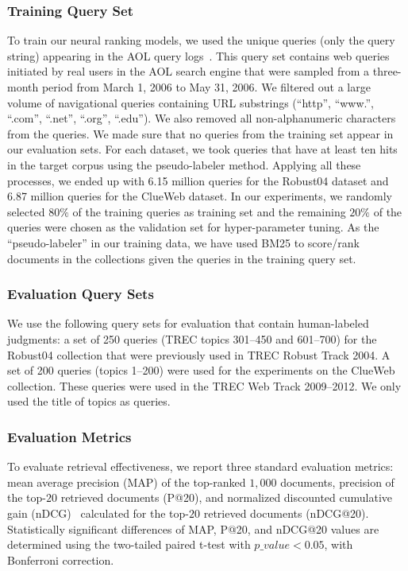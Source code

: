 \subsubsection{Training Query Set}
\label{sec:query_set}
To train our neural ranking models, we used the unique queries (only the query string) appearing in the AOL query logs~\citep{Pass:2006}. This query set contains web queries initiated by real users in the AOL search engine that were sampled from a three-month period from March 1, 2006 to May 31, 2006. We filtered out a large volume of navigational queries containing URL substrings (``http'', ``www.'', ``.com'', ``.net'', ``.org'', ``.edu''). We also removed all non-alphanumeric characters from the queries. We made sure that no queries from the training set appear in our evaluation sets. For each dataset, we took queries that have at least ten hits in the target corpus using the pseudo-labeler method. Applying all these processes, we ended up with 6.15 million queries for the Robust04 dataset and 6.87 million queries for the ClueWeb dataset. 
In our experiments, we randomly selected $80\%$ of the training queries as training set and the remaining $20\%$ of the queries were chosen as the validation set for hyper-parameter tuning. As the ``pseudo-labeler'' in our training data, we have used BM25 to score/rank documents in the collections given the queries in the training query set.

\subsubsection{Evaluation Query Sets} 
We use the following query sets for evaluation that contain human-labeled judgments: a set of 250 queries (TREC topics 301--450 and 601--700) for the Robust04 collection that were previously used in TREC Robust Track 2004. A set of 200 queries (topics 1--200) were used for the experiments on the ClueWeb collection. These queries were used in the TREC Web Track 2009--2012. We only used the title of topics as queries.

\subsubsection{Evaluation Metrics}
To evaluate retrieval effectiveness, we report three standard evaluation metrics: mean average precision (MAP) of the top-ranked $1,000$ documents, precision of the top-$20$ retrieved documents (P@20), and normalized discounted cumulative gain (nDCG)~\citep{Jarvelin:2002} calculated for the top-$20$ retrieved documents (nDCG@20). Statistically significant differences of MAP, P@20, and nDCG@20 values are determined using the two-tailed paired t-test with $p\_value<0.05$, with Bonferroni correction.


